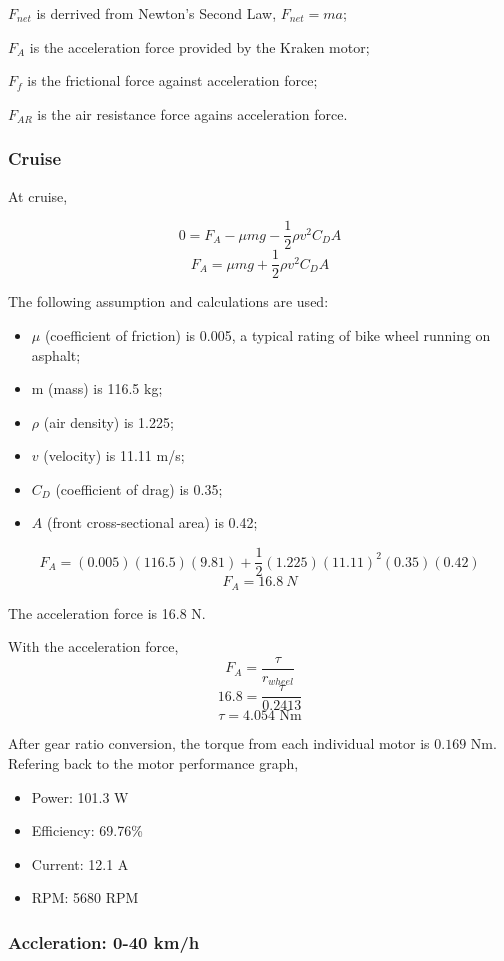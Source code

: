 \documentclass[12pt]{article}
\begin{document}
\bigskip


$F_{net}$ is derrived from Newton's Second Law, $F_{net} = ma$;

$F_A$ is the acceleration force provided by the Kraken motor;

$F_f$ is the frictional force against acceleration force;

$F_{AR}$ is the air resistance force agains acceleration force.

\subsubsection*{Cruise}

At cruise,

\[ 0 = F_A - \mu mg - \frac{1}{2}\rho v^2 C_D A \]
\[ F_A = \mu mg + \frac{1}{2}\rho v^2 C_D A \]

The following assumption and calculations are used:
\begin{itemize}
  \item $\mu$ (coefficient of friction) is 0.005, a typical rating of bike wheel running on asphalt;
  \item m (mass) is 116.5 kg;
  \item $\rho$ (air density) is 1.225;
  \item $v$ (velocity) is 11.11 m/s;
  \item $C_D$ (coefficient of drag) is 0.35;
  \item $A$ (front cross-sectional area) is 0.42;
\end{itemize}

\[ F_A = (0.005)(116.5)(9.81) + \frac{1}{2}(1.225)(11.11)^2(0.35)(0.42)\]
\[ F_A = 16.8 ~N\]

The acceleration force is 16.8 N.

With the acceleration force,
\[F_A = \frac{\tau}{r_{wheel}}\]
\[16.8 = \frac{\tau}{0.2413}\]
\[\tau = 4.054 \text{~Nm}\]

After gear ratio conversion, the torque from each individual motor is $0.169$ Nm. Refering
back to the motor performance graph, 
\begin{itemize}
  \item Power: 101.3 W
  \item Efficiency: 69.76\%
  \item Current: 12.1 A
  \item RPM: 5680 RPM\@ 
\end{itemize}

\subsubsection*{Accleration: 0-40 km/h}
\end{document}
